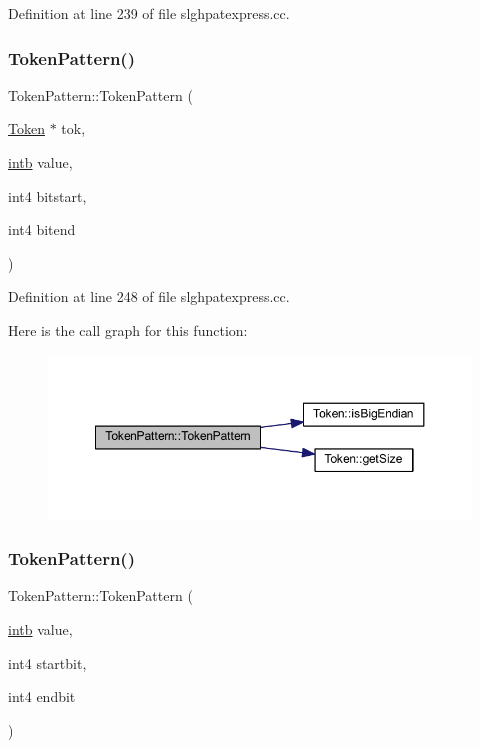 Definition at line 239 of file slghpatexpress.\+cc.

\mbox{\label{class_token_pattern_a3f36ba0774ba31996a2d828767f40ee4}} 
\subsubsection{\texorpdfstring{TokenPattern()}{TokenPattern()}\hspace{0.1cm}{\footnotesize\ttfamily [4/6]}}
{\footnotesize\ttfamily Token\+Pattern\+::\+Token\+Pattern (\begin{DoxyParamCaption}\item[{\mbox{\hyperlink{class_token}{Token}} $\ast$}]{tok,  }\item[{\mbox{\hyperlink{types_8h_aa925ba3e627c2df89d5b1cfe84fb8572}{intb}}}]{value,  }\item[{int4}]{bitstart,  }\item[{int4}]{bitend }\end{DoxyParamCaption})}



Definition at line 248 of file slghpatexpress.\+cc.

Here is the call graph for this function\+:
\nopagebreak
\begin{figure}[H]
\begin{center}
\leavevmode
\includegraphics[width=350pt]{class_token_pattern_a3f36ba0774ba31996a2d828767f40ee4_cgraph}
\end{center}
\end{figure}
\mbox{\label{class_token_pattern_a4b473d0abd3575ba26475aa9de9a7ed6}} 
\subsubsection{\texorpdfstring{TokenPattern()}{TokenPattern()}\hspace{0.1cm}{\footnotesize\ttfamily [5/6]}}
{\footnotesize\ttfamily Token\+Pattern\+::\+Token\+Pattern (\begin{DoxyParamCaption}\item[{\mbox{\hyperlink{types_8h_aa925ba3e627c2df89d5b1cfe84fb8572}{intb}}}]{value,  }\item[{int4}]{startbit,  }\item[{int4}]{endbit }\end{DoxyParamCaption})}



